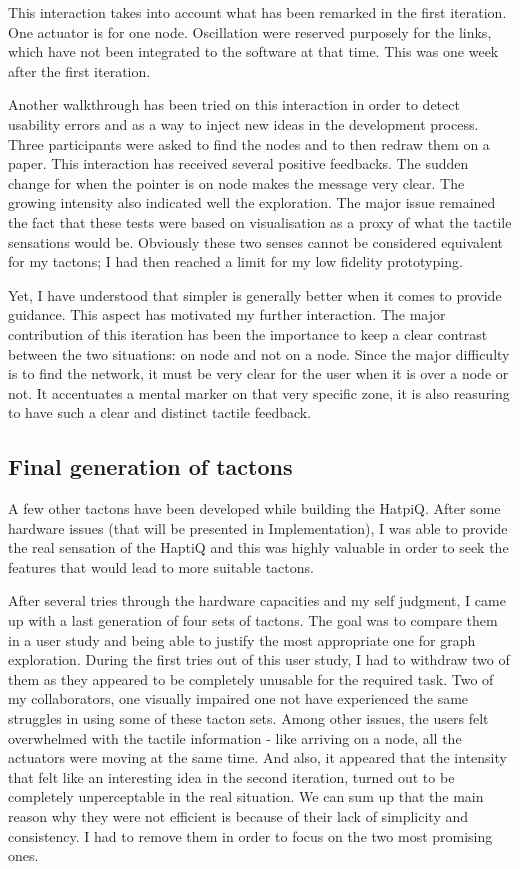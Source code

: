 This interaction takes into account what has been remarked in the first
iteration. One actuator is for one node. Oscillation were reserved
purposely for the links, which have not been integrated to the software
at that time. This was one week after the first iteration.

Another walkthrough has been tried on this interaction in order to
detect usability errors and as a way to inject new ideas in the development process. Three participants were asked to find the nodes and to then redraw them on a paper.
This interaction has received several positive feedbacks. The sudden change
for when the pointer is on node makes the message very clear. The
growing intensity also indicated well the exploration. The major issue
remained the fact that these tests were based on visualisation as a
proxy of what the tactile sensations would be. Obviously these two
senses cannot be considered equivalent for my tactons; I had then
reached a limit for my low fidelity prototyping.

Yet, I have understood that simpler is generally better when it comes to
provide guidance. This aspect has motivated my further interaction. The
major contribution of this iteration has been the importance to keep a
clear contrast between the two situations: on node and not on a node.
Since the major difficulty is to find the network, it must be very clear
for the user when it is over a node or not. It accentuates a mental
marker on that very specific zone, it is also reasuring to have such a
clear and distinct tactile feedback.

\subsection{Final generation of
tactons}\label{final-generation-of-tactons}

A few other tactons have been developed while building the HatpiQ. After some hardware issues (that will be presented in
Implementation), I was able to provide the real sensation of the HaptiQ
and this was highly valuable in order to seek the features that would
lead to more suitable tactons.

After several tries through the hardware capacities and my self
judgment, I came up with a last generation of four sets of tactons. The
goal was to compare them in a user study and being able to justify the
most appropriate one for graph exploration. During the first tries out
of this user study, I had to withdraw two of them as they appeared to be
completely unusable for the required task. Two of my collaborators, one
visually impaired one not have experienced the same struggles in using
some of these tacton sets. Among other issues, the users felt
overwhelmed with the tactile information - like arriving on a node, all
the actuators were moving at the same time. And also, it appeared that
the intensity that felt like an interesting idea in the second
iteration, turned out to be completely unperceptable in the real
situation. We can sum up that the main reason why they were not
efficient is because of their lack of simplicity and consistency. I had
to remove them in order to focus on the two most promising ones.

